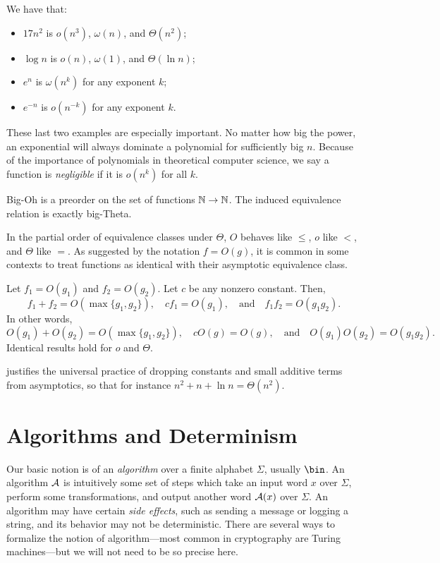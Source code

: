 \begin{ex}We have that:
  \begin{itemize}
    \item $17n^2$ is $o(n^3)$, $\omega(n)$, and $\Theta(n^2)$;
    \item $\log n$ is $o(n)$, $\omega(1)$, and $\Theta(\ln n)$;
    \item $e^n$ is $\omega(n^k)$ for any exponent $k$;
    \item $e^{-n}$ is $o(n^{-k})$ for any exponent $k$.
  \end{itemize}

  These last two examples are especially important. No matter how big the power,
  an exponential will always dominate a polynomial for sufficiently big $n$.
  Because of the importance of polynomials in theoretical computer science, we
  say a function is \emph{negligible} if it is $o(n^k)$ for all $k$.
\end{ex}

\begin{prop}
  Big-Oh is a preorder on the set of functions $\mathbb{N}\to\mathbb{N}$. The induced
  equivalence relation is exactly big-Theta.
\end{prop}

In the partial order of equivalence classes under $\Theta$, $O$ behaves like
$\leq$, $o$ like $<$, and $\Theta$ like $=$. As suggested by the notation $f =
O(g)$, it is common in some contexts to treat functions as identical with their
asymptotic equivalence class.

\begin{prop}\label{thm:asymptotic closure}
  Let $f_1 = O(g_1)$ and $f_2 = O(g_2)$. Let $c$ be any nonzero constant. Then,
  \[
    f_1 + f_2 = O(\max\{g_1,g_2\}),\quad
    cf_1 = O(g_1),\quad\text{and}\quad
    f_1f_2 = O(g_1g_2).
  \]
  In other words, \[
    O(g_1) + O(g_2) = O(\max\{g_1,g_2\}),\quad cO(g) = O(g),\quad\text{and}\quad O(g_1)O(g_2) = O(g_1g_2).
  \]
  Identical results hold for $o$ and $\Theta$.
\end{prop}

 justifies the universal practice
of dropping constants and small additive terms from asymptotics, so that for
instance $n^2 + n + \ln n = \Theta(n^2)$.

\section{Algorithms and Determinism}

Our basic notion is of an \emph{algorithm} over a finite alphabet $\Sigma$,
usually $\bin$. An algorithm $\mathcal{A}$ is intuitively some set of steps which take
an input word $x$ over $\Sigma$, perform some transformations, and output
another word $\mathcal{A}(x)$ over $\Sigma$. An algorithm may have certain \emph{side
effects}, such as sending a message or logging a string, and its behavior may
not be deterministic. There are several ways to formalize the notion of
algorithm---most common in cryptography are Turing machines---but we will not
need to be so precise here.

